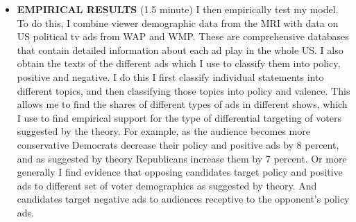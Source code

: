 \documentclass[12pt]{article}
\theoremstyle{plain}
\theoremstyle{plain}
\theoremstyle{plain}
\theoremstyle{plain}
\theoremstyle{plain}
\theoremstyle{plain}
\begin{document}
\begin{itemize}
\item \textbf{EMPIRICAL RESULTS} (1.5 minute)
I then empirically test my model.
To do this, I combine viewer demographic data from the MRI with data on US political tv ads from WAP and WMP.
These are comprehensive databases that contain detailed information about each ad play in the whole US.
I also obtain the texts of the different ads which I use to classify them into policy, positive and negative.
I do this I first classify individual statements into different topics, and then classifying those topics into policy and valence.
This allows me to find the shares of different types of ads in different shows, which I use to find empirical support for the type of differential targeting of voters suggested by the theory.
For example, as the audience becomes more conservative Democrats decrease their policy and positive ads by 8 percent,
and as suggested by theory Republicans increase them by 7 percent.
Or more generally I find evidence that opposing candidates target policy and positive ads to different set of voter demographics as suggested by theory.
And candidates target negative ads to audiences receptive to the opponent's policy ads.
\end{itemize}
\end{document}
